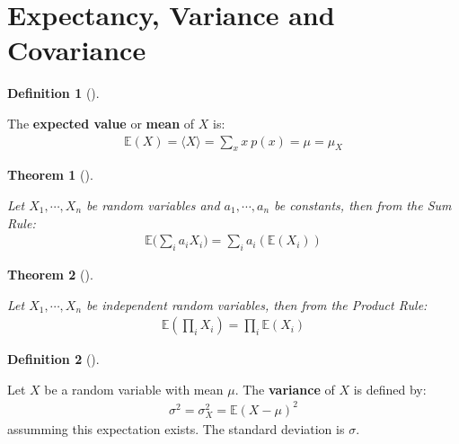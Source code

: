 \documentclass[
  letterpaper,
  12pt,
  british]{tufte-book}
\theoremstyle{plain}
\theoremstyle{definition}
\newtheorem{definition}{Definition}[chapter]
\theoremstyle{plain}
\newtheorem{theorem}{Theorem}[chapter]
\theoremstyle{remark}
\begin{document}
\hypertarget{expectancy-variance-and-covariance}{%
\section{Expectancy, Variance and
Covariance}\label{expectancy-variance-and-covariance}}

\leavevmode{}%
\begin{definition}[]\label{def-mean}

The \textbf{expected value} or \textbf{mean} of \(\mathit{X}\) is:
\begin{align}
        \mathbb{E}(\mathit{X})=\langle \mathit{X}\rangle = \sum_{x} \mathit{x}~p(\mathit{x}) = \mu = \mu_X
\end{align}

\end{definition}

\leavevmode{}%
\begin{theorem}[]\label{thm-sum_rule}

Let \(\mathit{X}_1, \cdots, \mathit{X}_n\) be random variables and
\(a_1, \cdots, a_n\) be constants, then from the \emph{Sum Rule}:
\begin{align}
        \mathbb{E}\biggl(\sum_i a_i\mathit{X}_i\biggr)=\sum_i a_i(\mathbb{E}(\mathit{X}_i))
\end{align}

\end{theorem}

\leavevmode{}%
\begin{theorem}[]\label{thm-product_rule}

Let \(\mathit{X}_1, \cdots, \mathit{X}_n\) be independent random
variables, then from the \emph{Product Rule}: \begin{align}
        \mathbb{E}(\prod_i \mathit{X}_i)=\prod_i \mathbb{E}(\mathit{X}_i)
\end{align}

\end{theorem}

\leavevmode{}%
\begin{definition}[]\label{def-variance}

Let \(\mathit{X}\) be a random variable with mean \(\mu\). The
\textbf{variance} of \(\mathit{X}\) is defined by: \begin{align}
    \sigma^2 = \sigma_{\mathit{X}}^2 =\mathbb{E}{(\mathit{X}- \mu)}^2
\end{align} assumming this expectation exists. The standard deviation is
\(\sigma\).

\end{definition}
\end{document}
